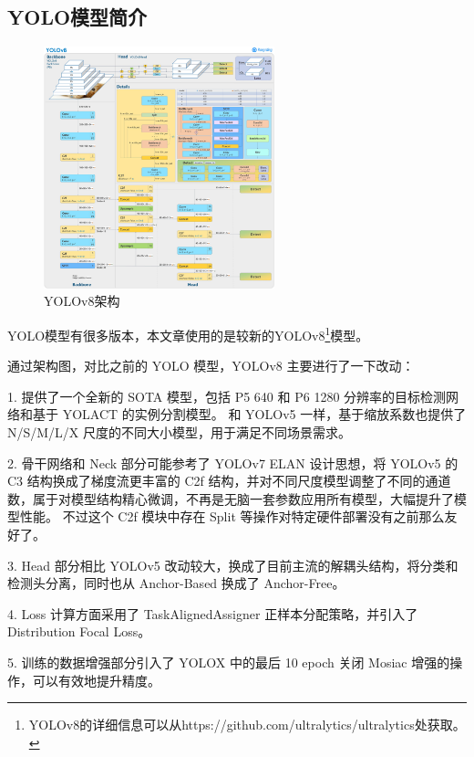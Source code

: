 \documentclass[UTF8]{ctexart}
\begin{document}
\subsection{YOLO模型简介}


\begin{figure}
    \centering %
    \includegraphics[height=7cm]{../YOLO/pics/img1.png}
    \caption{YOLOv8架构}
\end{figure}

YOLO模型有很多版本，本文章使用的是较新的YOLOv8\footnote{YOLOv8的详细信息可以从https://github.com/ultralytics/ultralytics处获取。}模型。

通过架构图，对比之前的 YOLO 模型，YOLOv8 主要进行了一下改动： \par
1. 提供了一个全新的 SOTA 模型，包括 P5 640 和 P6 1280 分辨率的目标检测网络和基于 YOLACT 的实例分割模型。
和 YOLOv5 一样，基于缩放系数也提供了 N/S/M/L/X 尺度的不同大小模型，用于满足不同场景需求。 \par
2. 骨干网络和 Neck 部分可能参考了 YOLOv7 ELAN 设计思想，将 YOLOv5 的 C3 结构换成了梯度流更丰富的 C2f 结构，并对不同尺度模型调整了不同的通道数，属于对模型结构精心微调，不再是无脑一套参数应用所有模型，大幅提升了模型性能。
不过这个 C2f 模块中存在 Split 等操作对特定硬件部署没有之前那么友好了。\par
3. Head 部分相比 YOLOv5 改动较大，换成了目前主流的解耦头结构，将分类和检测头分离，同时也从 Anchor-Based 换成了 Anchor-Free。\par
4. Loss 计算方面采用了 TaskAlignedAssigner 正样本分配策略，并引入了 Distribution Focal Loss。\par
5. 训练的数据增强部分引入了 YOLOX 中的最后 10 epoch 关闭 Mosiac 增强的操作，可以有效地提升精度。\par
\end{document}
